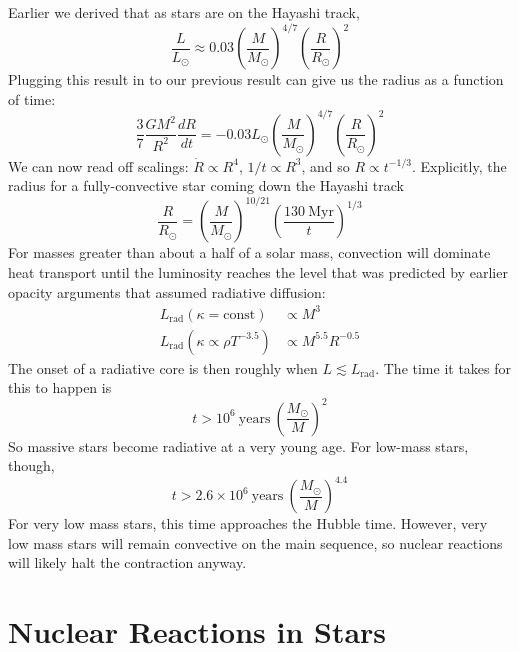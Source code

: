 \documentclass[10pt]{article}
\numberwithin{equation}{section}
\begin{document}
  Earlier we derived that as stars are on the Hayashi track,
  \begin{equation}
    \label{eq:88}
    \frac{L}{L_\odot}\approx 0.03\left(\frac{M}{M_\odot}\right)^{4/7}\left
(\frac{R}{R_\odot}\right)^2
  \end{equation}
  Plugging this result in to our previous result can give us the
  radius as a function of time:
  \begin{equation}
    \label{eq:89}
		\frac{3}{7}\frac{GM^2}{R^2} \frac{dR}{dt} = -0.03 L_\odot
		\left(\frac{M}{M_\odot}\right)^{4/7}\left(\frac{R}{R_\odot}\right)^2
  \end{equation}
  We can now read off scalings: $\dot{R}\propto R^4$, $1/t\propto
  R^3$, and so $R\propto t^{-1/3}$. Explicitly, the radius for a
  fully-convective star coming down the Hayashi track
  \begin{equation}
    \label{eq:90}
    \frac{R}{R_\odot}=\left(\frac{M}{M_\odot}\right)^{10/21}\left(\frac
{130\ \mathrm{Myr}}{t}\right)^{1/3}
  \end{equation}
  For masses greater than about a half of a solar mass, convection
  will dominate heat transport until the luminosity reaches the level
  that was predicted by earlier opacity arguments that assumed
  radiative diffusion:
	\begin{align}
		\label{eq:rad_trans:1} L_{\mathrm{rad}}(\kappa = \mathrm{const}) 
			&\propto M^3\\
		\label{eq:rad_trans:2}L_{\mathrm{rad}}(\kappa \propto \rho T^{-3.5})
			&\propto M^{5.5}R^{-0.5}
	\end{align}
	The onset of a radiative core is then roughly
  when $L\lesssim L_{\mathrm{rad}}$. The time it takes for this to
  happen is
  \begin{equation}
    \label{eq:91}
    t>10^6\ \mathrm{years}\ \left(\frac{M_\odot}{M}\right)^2
  \end{equation}
  So massive stars become radiative at a very young age. For low-mass
  stars, though,
  \begin{equation}
    \label{eq:92}
    t>2.6\times 10^6\ \mathrm{years}\ \left(\frac{M_\odot}{M}\right)^{4.4}
  \end{equation}
  For very low mass stars, this time approaches the Hubble
  time. However, very low mass stars will remain convective on the
  main sequence, so nuclear reactions will likely halt the contraction
  anyway.

  \section{Nuclear Reactions in Stars}
  \label{sec:nucl-react-stars}
\end{document}
